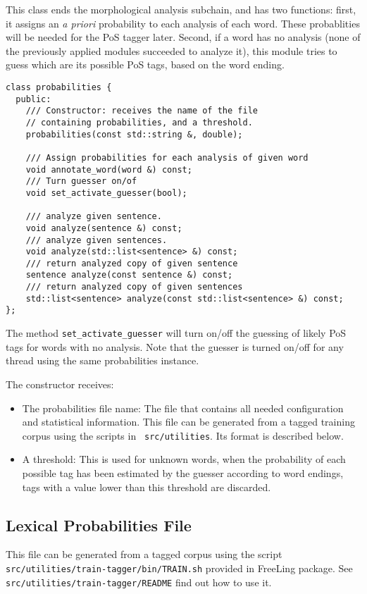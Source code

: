 \documentclass[a4paper]{book}
\begin{document}
 This class ends the morphological analysis subchain, and has two
 functions: first, it assigns an {\em a priori} probability to each
 analysis of each word. These probablities will be needed for the PoS
 tagger later. Second, if a word has no analysis (none of the previously
 applied modules succeeded to analyze it), this module tries to guess
 which are its possible PoS tags, based on the word ending.
\begin{verbatim}
class probabilities {
  public:
    /// Constructor: receives the name of the file
    // containing probabilities, and a threshold.
    probabilities(const std::string &, double);

    /// Assign probabilities for each analysis of given word
    void annotate_word(word &) const;
    /// Turn guesser on/of
    void set_activate_guesser(bool);

    /// analyze given sentence.
    void analyze(sentence &) const;
    /// analyze given sentences.
    void analyze(std::list<sentence> &) const;
    /// return analyzed copy of given sentence
    sentence analyze(const sentence &) const;
    /// return analyzed copy of given sentences
    std::list<sentence> analyze(const std::list<sentence> &) const;
};
\end{verbatim}

  The method \verb#set_activate_guesser# will turn on/off the guessing
 of likely PoS tags for words with no analysis. Note that the guesser
 is turned on/off for any thread using the same probabilities instance.

  The constructor receives:
\begin{itemize}
\item The probabilities file name: The file that contains all needed
  configuration and statistical information. This file can be
  generated from a tagged training corpus using the scripts in {\tt
    src/utilities}. Its format is described below.
\item A threshold: This is used for unknown words, when the
  probability of each possible tag has been estimated by the guesser
  according to word endings, tags with a value lower than this
  threshold are discarded.
\end{itemize}

\subsection{Lexical Probabilities File}

This file can be generated from a tagged corpus using the script
 {\tt src/utilities/train-tagger/bin/TRAIN.sh} provided in FreeLing package.
 See  {\tt src/utilities/train-tagger/README} find out how to use it.
\end{document}
